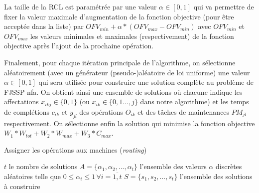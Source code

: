 \documentclass[10pt,a4paper]{scrartcl}
\begin{document}
La taille de la RCL est paramétrée par une valeur $\alpha \in [0,1]$ qui
va permettre de fixer la valeur maximale d'augmentation de la fonction objective (pour être
acceptée dans la liste) par $OFV_{min}+\alpha*(OFV_{max}-OFV_{min})$ avec $OFV_{min}$ et $OFV_{max}$
les valeurs minimales et maximales (respectivement) de la fonction objective après l'ajout de la prochaine opération.

Finalement, pour chaque itération principale de l'algorithme, on sélectionne aléatoirement (avec un générateur (pseudo-)aléatoire de loi uniforme)
une valeur  $\alpha \in [0,1]$ qui sera utilisée pour construire une solution
complète au problème de FJSSP-nfa. On obtient ainsi une ensemble de solutions
où chacune indique les affectations $x_{ikj} \in \{0,1\}$ (ou $x_{ik} \in \{0,1...,j\}$ dans
notre algorithme) et les temps de complétions $c_{ik}$ et $y_{jl}$ des opérations $O_{ik}$
et des tâches de maintenances $PM_{jl}$ respectivement. On sélectionne enfin la solution
qui minimise la fonction objective $W_1*W_{tot}+W_2*W_{max}+W_3*C_{max}$.

\begin{algorithm}
  \caption{Assigner les opérations aux machines (\emph{routing})}
  \label{algo:routing}
  $t$ le nombre de solutions\;
  $A = \{\alpha_1, \alpha_2,..., \alpha_t\}$ l'ensemble des valeurs $\alpha$ discrètes aléatoires telle que $0 \leq \alpha_i \leq 1 \, \forall i = \overline{1,t}$\;
  $S = \{s_1, s_2,..., s_t\}$ l'ensemble des solutions à construire\;
\end{algorithm}
\end{document}
